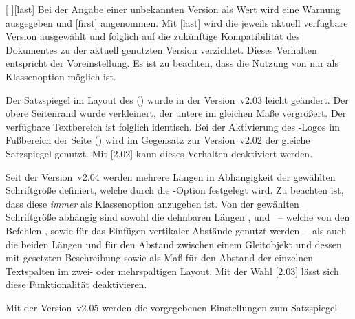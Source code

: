 \begin{Declaration*}{}
\begin{Declaration*}{}
\begin{Declaration*}{}
\begin{Declaration}[v2.03]{[%
  \textOR{}\textOR{}%
]}[last]
Bei der Angabe einer unbekannten Version als Wert wird eine Warnung ausgegeben 
und [first] angenommen. Mit [last] wird die 
jeweils aktuell verfügbare Version ausgewählt und folglich auf die zukünftige 
Kompatibilität des Dokumentes zu der aktuell genutzten Version verzichtet. 
Dieses Verhalten entspricht der Voreinstellung. Es ist zu beachten, dass die 
Nutzung von  nur als Klassenoption möglich ist.
%
\begin{values}
\item[\PValue{2.02}\textOR\PValue{first}]
  Der Satzspiegel im Layout des \CDs () wurde in 
  der Version~v2.03 leicht geändert. Der obere Seitenrand wurde verkleinert, 
  der untere im gleichen Maße vergrößert. Der verfügbare Textbereich ist 
  folglich identisch. Bei der Aktivierung des \DDC-Logos im Fußbereich der 
  Seite () wird im Gegensatz zur Version~v2.02 der 
  gleiche Satzspiegel genutzt. Mit [2.02] kann dieses 
  Verhalten deaktiviert werden.
\item[\PValue{2.03}]
  Seit der Version~v2.04 werden mehrere Längen in Abhängigkeit der gewählten 
  Schriftgröße definiert, welche durch die \KOMAScript-Option  
  festgelegt wird. Zu beachten ist, dass diese \emph{immer} als Klassenoption 
  anzugeben ist. Von der gewählten Schriftgröße abhängig sind sowohl die 
  dehnbaren Längen ,  und 
  ~-- welche von den Befehlen , 
   sowie  für das Einfügen vertikaler Abstände 
  genutzt werden~-- als auch die beiden Längen  und 
   für den Abstand zwischen einem Gleitobjekt und 
  dessen mit  gesetzten Beschreibung sowie  
  als Maß für den Abstand der einzelnen Textspalten im zwei- oder mehrspaltigen 
  Layout. Mit der Wahl [2.03] lässt sich diese Funktionalität 
  deaktivieren.
\item[\PValue{2.04}]
  Mit der Version~v2.05 werden die vorgegebenen Einstellungen zum Satzspiegel 

\end{values}
\end{Declaration}
\end{Declaration*}
\end{Declaration*}
\end{Declaration*}
